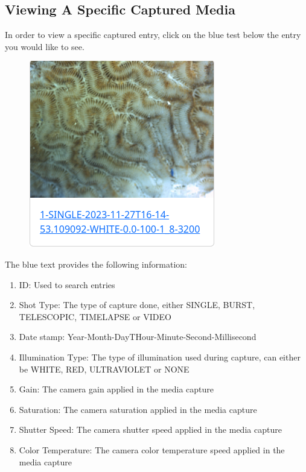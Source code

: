 \documentclass[12pt]{article}
\begin{document}
\begin{center}
	\subsection{Viewing A Specific Captured Media}
	In order to view a specific captured entry, click on the blue test below the entry you would like to see.
	\begin{figure}[H]
		\includegraphics[width=\textwidth]{Figures/Viewing-Specific-media.png}
	\end{figure}
	The blue text provides the following information:
	\begin{enumerate}
		\item ID: Used to search entries
		\item Shot Type: The type of capture done, either SINGLE, BURST, TELESCOPIC, TIMELAPSE or VIDEO
		\item Date stamp: Year-Month-DayTHour-Minute-Second-Millisecond
		\item Illumination Type: The type of illumination used during capture, can either be WHITE, RED, ULTRAVIOLET or NONE
		\item Gain: The camera gain applied in the media capture
		\item Saturation: The camera saturation applied in the media capture
		\item Shutter Speed: The camera shutter speed applied in the media capture
		\item Color Temperature: The camera color temperature speed applied in the media capture
	\end{enumerate}

\end{center}
\end{document}
